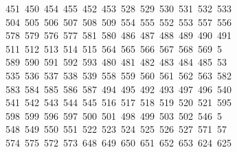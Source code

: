 \begin{tabbing}
\ 451\ 450\ 454\ 455\ 452\ 453\ 528\ 529\ 530\ 531\ 532\ 533\\[0pt]
\>\ 504\ 505\ 506\ 507\ 508\ 509\ 554\ 555\ 552\ 553\ 557\ 556\\[0pt]
\>\ 578\ 579\ 576\ 577\ 581\ 580\ 486\ 487\ 488\ 489\ 490\ 491\ \\[0pt]
\ 511\ 512\ 513\ 514\ 515\ 564\ 565\ 566\ 567\ 568\ 569\ 5\\[0pt]
\ 589\ 590\ 591\ 592\ 593\ 480\ 481\ 482\ 483\ 484\ 485\ 53\\[0pt]
\ 535\ 536\ 537\ 538\ 539\ 558\ 559\ 560\ 561\ 562\ 563\ 582\\[0pt]
\>\ 583\ 584\ 585\ 586\ 587\ 494\ 495\ 492\ 493\ 497\ 496\ 540\\[0pt]
\>\ 541\ 542\ 543\ 544\ 545\ 516\ 517\ 518\ 519\ 520\ 521\ 595\ \\[0pt]
\ 598\ 599\ 596\ 597\ 500\ 501\ 498\ 499\ 503\ 502\ 546\ 5\\[0pt]
\ 548\ 549\ 550\ 551\ 522\ 523\ 524\ 525\ 526\ 527\ 571\ 57\\[0pt]
\ 574\ 575\ 572\ 573\ 648\ 649\ 650\ 651\ 652\ 653\ 624\ 625\\[0pt]

\end{tabbing}
